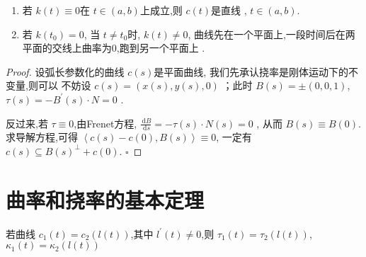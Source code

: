 \documentclass[../../古典微分几何.tex]{subfiles}
\begin{document}
\begin{itemize}
    \begin{remark}
        \begin{enumerate}
            \item 若 \(  k\left( t \right)\equiv 0   \)在 \(  t \in \left( a,b \right)   \)上成立,则 \(  c\left( t \right)   \)是直线 , \(   t \in \left( a,b \right)   \).
            \item 若 \(  k\left( t_0 \right)= 0   \),  当 \(  t \neq t_0  \)时, \(  k\left( t \right)\neq 0   \),    曲线先在一个平面上,一段时间后在两平面的交线上曲率为0,跑到另一个平面上   .
        \end{enumerate}
        
    \end{remark}

    \begin{proof}
        设弧长参数化的曲线 \(  c\left( s \right)   \)是平面曲线, 我们先承认挠率是刚体运动下的不变量,则可以
        不妨设 \(  c\left( s \right)= \left( x\left( s \right),y\left( s \right),0   \right)    \) 
        ；此时 \(  B\left( s \right)= \pm \left( 0,0,1 \right)    \), \(  \tau \left( s \right)=  - B^{\prime} \left( s \right)\cdot N =  0    \)  .

        反过来,若 \(  \tau \equiv 0  \),由Frenet方程, \(  \frac{\,\mathrm{d} B }{\,\mathrm{d} s }=-\tau \left( s \right)\cdot N\left( s \right)= 0     \)   ,
        从而 \(  B\left( s \right)\equiv B\left( 0 \right)    \).求导解方程,可得 \(  \left<c\left( s \right)-c\left( 0 \right),B\left( s \right)    \right>\equiv 0  \), 一定有 \(  c\left( s \right)\subseteq B\left( s \right)^{\perp } + c\left( 0 \right)    \).  
        \hfill $\square$
    \end{proof}

\end{itemize}

\section{曲率和挠率的基本定理}

\begin{proposition}
    若曲线 \(  c_1\left( t \right)= c_2\left( l\left( t \right)  \right)    \),其中 \(  l^{\prime} \left( t \right)\neq 0   \),则 \(  \tau _1 \left( t \right)= \tau _2 \left( l\left( t \right)  \right)    \), \(   \kappa _1 \left( t \right)=  \kappa _2 \left( l\left( t \right)  \right)    \)    
\end{proposition}
\end{document}

